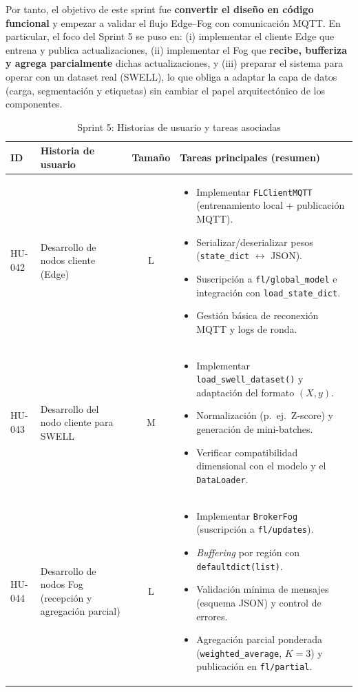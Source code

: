 \documentclass{report}
\begin{document}
Por tanto, el objetivo de este sprint fue \textbf{convertir el diseño en código funcional} y empezar a validar el flujo Edge--Fog con comunicación MQTT. En particular, el foco del Sprint 5 se puso en:
(i) implementar el cliente Edge que entrena y publica actualizaciones, 
(ii) implementar el Fog que \textbf{recibe, bufferiza y agrega parcialmente} dichas actualizaciones, y 
(iii) preparar el sistema para operar con un dataset real (SWELL), lo que obliga a adaptar la capa de datos (carga, segmentación y etiquetas) sin cambiar el papel arquitectónico de los componentes.
\begin{table}[H]
\centering
\footnotesize
\caption{Sprint 5: Historias de usuario y tareas asociadas}
\label{tab:sprint5}
\renewcommand{\arraystretch}{1.25}
\setlength{\tabcolsep}{4pt}

\begin{tabular}{|l|p{4.8cm}|c|p{5.6cm}|}
\hline
\textbf{ID} & \textbf{Historia de usuario} & \textbf{Tamaño} & \textbf{Tareas principales (resumen)} \\ \hline

HU-042 &
Desarrollo de nodos cliente (Edge) &
L &
\begin{itemize}\setlength\itemsep{0.2em}
  \item Implementar \texttt{FLClientMQTT} (entrenamiento local + publicación MQTT).
  \item Serializar/deserializar pesos (\texttt{state\_dict} $\leftrightarrow$ JSON).
  \item Suscripción a \texttt{fl/global\_model} e integración con \texttt{load\_state\_dict}.
  \item Gestión básica de reconexión MQTT y logs de ronda.
\end{itemize}
\\ \hline

HU-043 &
Desarrollo del nodo cliente para SWELL &
M &
\begin{itemize}\setlength\itemsep{0.2em}
  \item Implementar \texttt{load\_swell\_dataset()} y adaptación del formato $(X,y)$.
  \item Normalización (p.\ ej.\ Z-score) y generación de mini-batches.
  \item Verificar compatibilidad dimensional con el modelo y el \texttt{DataLoader}.
\end{itemize}
\\ \hline

HU-044 &
Desarrollo de nodos Fog (recepción y agregación parcial) &
L &
\begin{itemize}\setlength\itemsep{0.2em}
  \item Implementar \texttt{BrokerFog} (suscripción a \texttt{fl/updates}).
  \item \emph{Buffering} por región con \texttt{defaultdict(list)}.
  \item Validación mínima de mensajes (esquema JSON) y control de errores.
  \item Agregación parcial ponderada (\texttt{weighted\_average}, $K=3$) y publicación en \texttt{fl/partial}.
\end{itemize}
\\ \hline


\end{tabular}
\end{table}
\end{document}
